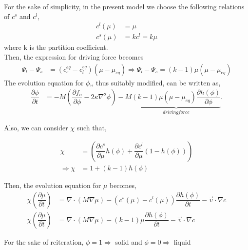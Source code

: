 \documentclass[a4paper]{report}
\begin{document}
For the sake of simplicity, in the present model we choose the following relations of $c^s$ and $c^l$,
\begin{align}
c^l\left(\mu\right) &= \mu \\
c^s\left(\mu\right) &= kc^l = k\mu
\end{align}
where k is the partition coefficient.\\

Then, the expression for driving force becomes
\begin{align}
 \Psi_l-\Psi_s &= (c_s^{eq} - c_l^{eq})\left(\mu-\mu_{eq}\right)
\Rightarrow \Psi_l-\Psi_s = (k - 1)\mu\left(\mu-\mu_{eq}\right)
\end{align} 
The evolution equation for $\phi$,, thus suitably modified, can be written as,
  \begin{align}
  \dfrac{\partial \phi}{\partial t} &= -M \left(\dfrac{\partial f_o}{\partial \phi} - 2\kappa\nabla^{2}\phi\right)  
					-M\underbrace{(k - 1)\mu\left(\mu-\mu_{eq}\right)\dfrac{\partial h\left(\phi\right)}{\partial \phi}}_{driving force}.
  \end{align}

Also, we can consider $\chi$ such that,

\begin{align}
	\chi  &= \left(\dfrac{\partial c^s}{\partial \mu}h\left(\phi\right) + \dfrac{\partial c^l}{\partial \mu}(1-h\left(\phi\right))\right)\\
	\Rightarrow\chi &= 1 + \left(k-1\right)h\left(\phi\right)
\end{align}

Then, the evolution equation for $\mu$ becomes,
\begin{align}
		\chi \left(\dfrac{\partial \mu}{\partial t}\right) &= \nabla \cdot \left(M\nabla\mu\right) 
	- \left(c^s\left(\mu\right) - c^l \left(\mu\right)\right)\dfrac{\partial h\left(\phi\right)}{\partial t}- \vec{v}\cdot\nabla c\\
		\chi \left(\dfrac{\partial \mu}{\partial t}\right) &= \nabla \cdot \left(M\nabla\mu\right) 
	- \left(k-1\right)\mu\dfrac{\partial h\left(\phi\right)}{\partial t}- \vec{v}\cdot\nabla c
\end{align}

For the sake of reiteration,
$\phi = 1 \Longrightarrow$ solid and $\phi = 0 \Longrightarrow$ liquid
\end{document}

